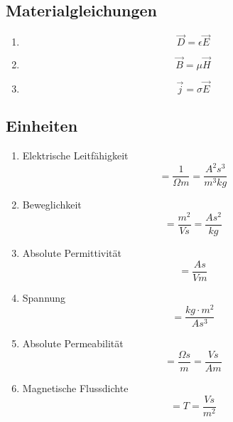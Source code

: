 \documentclass[a4paper,twocolumn,10pt]{article}
\begin{document}
\subsection{Materialgleichungen}
\begin{enumerate}[label=$\bullet$]
\item
\begin{equation*}
\overrightarrow{D}=\epsilon\overrightarrow{E}
\end{equation*}
\item
\begin{equation*}
\overrightarrow{B}=\mu\overrightarrow{H}
\end{equation*}
\item
\begin{equation*}
\overrightarrow{j}=\sigma\overrightarrow{E}
\end{equation*}
\end{enumerate}

\subsection{Einheiten}
\begin{enumerate}[label=$\bullet$]
\item Elektrische Leitfähigkeit
\begin{equation*}
[\sigma]=\frac{1}{\Omega m}=\frac{A^2s^3}{m^3kg}
\end{equation*}
\item Beweglichkeit
\begin{equation*}
[\mu]=\frac{m^2}{Vs}=\frac{As^2}{kg}
\end{equation*}
\item Absolute Permittivität
\begin{equation*}
[\epsilon_0]=\frac{As}{Vm}
\end{equation*}
\item Spannung
\begin{equation*}
[V]=\frac{kg\cdot m^2}{As^3}
\end{equation*}
\item Absolute Permeabilität
\begin{equation*}
[\mu_0]=\frac{\Omega s}{m}=\frac{Vs}{Am}
\end{equation*}
\item Magnetische Flussdichte
\begin{equation*}
[B]=T=\frac{Vs}{m^2}
\end{equation*}
\end{enumerate}
\end{document}
